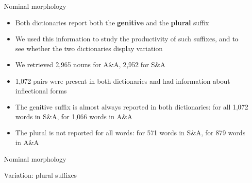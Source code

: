 \begin{frame}{Nominal morphology}
\begin{itemize}
    \item Both dictionaries report both the \textbf{genitive} and the \textbf{plural} suffix
    \item We used this information to study the productivity of such suffixes, and to see whether the two dictionaries display variation
    \item We retrieved 2,965 nouns for A\&A, 2,952 for S\&A
    \item 1,072 pairs were present in both dictionaries and had information about inflectional forms
    \item The genitive suffix is almost always reported in both dictionaries: for all 1,072 words in S\&A, for 1,066 words in A\&A
    \item The plural is not reported for all words: for 571 words in S\&A, for 879 words in A\&A %
\end{itemize}
\end{frame}

\begin{frame}{Nominal morphology}
\begin{center} Variation: plural suffixes
\end{center}
\begin{figure}[h]
\centering
{}
\end{figure}
\end{frame}

